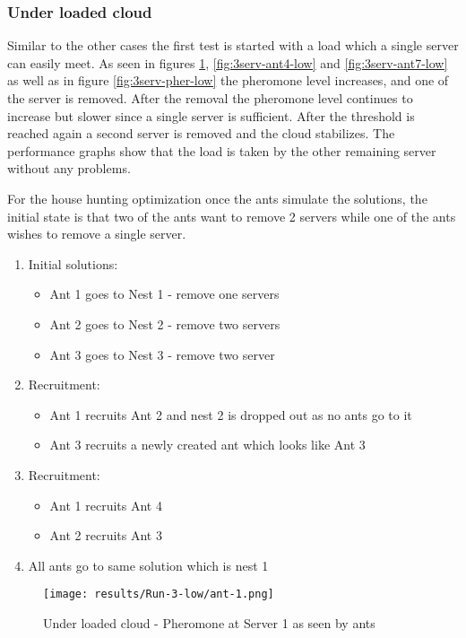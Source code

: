 \subsubsection{Under loaded cloud}

Similar to the other cases the first test is started with a load which a single server can easily meet. As seen in figures \ref{fig:3serv-ant1-low}, \ref{fig:3serv-ant4-low} and \ref{fig:3serv-ant7-low} as well as in figure \ref{fig:3serv-pher-low} the pheromone level increases, and one of the server is removed. After the removal the pheromone level continues to increase but slower since a single server is sufficient. After the threshold is reached again a second server is removed and the cloud stabilizes. The performance graphs show that the load is taken by the other remaining server without any problems.

For the house hunting optimization once the ants simulate the solutions, the initial state is that two of the ants want to remove 2 servers while one of the ants wishes to remove a single server.

\begin{enumerate}
	\item Initial solutions: 
	\begin{itemize}
		\item Ant 1 goes to Nest 1 - remove one servers
		\item Ant 2 goes to Nest 2 - remove two servers
		\item Ant 3 goes to Nest 3 - remove two server
	\end{itemize}
	\item Recruitment:
	\begin{itemize}
		\item Ant 1 recruits Ant 2 and nest 2 is dropped out as no ants go to it
		\item Ant 3 recruits a newly created ant which looks like Ant 3
	\end{itemize}
	\item Recruitment:
	\begin{itemize}
		\item Ant 1 recruits Ant 4
		\item Ant 2 recruits Ant 3
	\end{itemize}
	\item All ants go to same solution which is nest 1
\end{enumerate}

\begin{figure}[!h]
	\centering
		\texttt{[image: results/Run-3-low/ant-1.png]}
	\caption{Under loaded cloud - Pheromone at Server 1 as seen by ants}
	\label{fig:3serv-ant1-low}
\end{figure}

